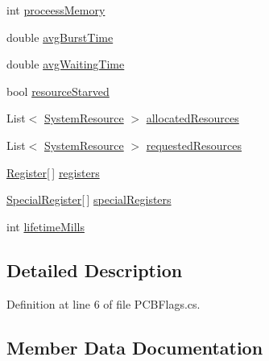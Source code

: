 \begin{DoxyCompactItemize}
\item 
int \hyperlink{struct_c_p_u___o_s___simulator_1_1_operating___system_1_1_p_c_b_flags_a4248a993bf5be874fcd2843269bb9058}{proceess\+Memory}
\item 
double \hyperlink{struct_c_p_u___o_s___simulator_1_1_operating___system_1_1_p_c_b_flags_a1c7b8ae576214d5e26c37727b15b8833}{avg\+Burst\+Time}
\item 
double \hyperlink{struct_c_p_u___o_s___simulator_1_1_operating___system_1_1_p_c_b_flags_ae6d30d555620b4fe5a92baea4ad933d1}{avg\+Waiting\+Time}
\item 
bool \hyperlink{struct_c_p_u___o_s___simulator_1_1_operating___system_1_1_p_c_b_flags_ad9a23e852aa137ab0289efebb5645b19}{resource\+Starved}
\item 
List$<$ \hyperlink{class_c_p_u___o_s___simulator_1_1_operating___system_1_1_system_resource}{System\+Resource} $>$ \hyperlink{struct_c_p_u___o_s___simulator_1_1_operating___system_1_1_p_c_b_flags_a204cecda661767e690738e40b127a8f0}{allocated\+Resources}
\item 
List$<$ \hyperlink{class_c_p_u___o_s___simulator_1_1_operating___system_1_1_system_resource}{System\+Resource} $>$ \hyperlink{struct_c_p_u___o_s___simulator_1_1_operating___system_1_1_p_c_b_flags_a74e802e68397e53df4bd3206888fac9f}{requested\+Resources}
\item 
\hyperlink{class_c_p_u___o_s___simulator_1_1_c_p_u_1_1_register}{Register}\mbox{[}$\,$\mbox{]} \hyperlink{struct_c_p_u___o_s___simulator_1_1_operating___system_1_1_p_c_b_flags_a98e0200286634bee59fa4e0b94daf5bc}{registers}
\item 
\hyperlink{class_c_p_u___o_s___simulator_1_1_c_p_u_1_1_special_register}{Special\+Register}\mbox{[}$\,$\mbox{]} \hyperlink{struct_c_p_u___o_s___simulator_1_1_operating___system_1_1_p_c_b_flags_aa313adebffa50118e5fbaa09122b32fd}{special\+Registers}
\item 
int \hyperlink{struct_c_p_u___o_s___simulator_1_1_operating___system_1_1_p_c_b_flags_a8079f3c5421cf89d5019718f857b4c7e}{lifetime\+Mills}
\end{DoxyCompactItemize}


\subsection{Detailed Description}


Definition at line 6 of file P\+C\+B\+Flags.\+cs.



\subsection{Member Data Documentation}
\hypertarget{struct_c_p_u___o_s___simulator_1_1_operating___system_1_1_p_c_b_flags_a204cecda661767e690738e40b127a8f0}{}
